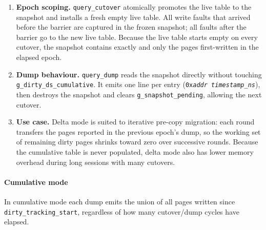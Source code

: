 \begin{enumerate}
    \item \textbf{Epoch scoping.}
          \texttt{query\_cutover} atomically promotes the live table to the
          snapshot and installs a fresh empty live table.
          All write faults that arrived before the barrier are captured in the
          frozen snapshot; all faults after the barrier go to the new live table.
          Because the live table starts empty on every cutover, the snapshot
          contains exactly and only the pages first-written in the elapsed epoch.

    \item \textbf{Dump behaviour.}
          \texttt{query\_dump} reads the snapshot directly without touching
          \texttt{g\_dirty\_ds\_cumulative}. It emits one line per entry
          (\texttt{0x\textit{addr}\ \textit{timestamp\_ns}}), then destroys the
          snapshot and clears \texttt{g\_snapshot\_pending}, allowing the next
          cutover.

    \item \textbf{Use case.}
          Delta mode is suited to iterative pre-copy migration: each round
          transfers the pages reported in the previous epoch's dump, so the
          working set of remaining dirty pages shrinks toward zero over successive
          rounds. Because the cumulative table is never populated, delta mode
          also has lower memory overhead during long sessions with many cutovers.
\end{enumerate}

\paragraph{Cumulative mode}
In cumulative mode each dump emits the union of all pages written since
\texttt{dirty\_tracking\_start}, regardless of how many cutover/dump cycles
have elapsed.

